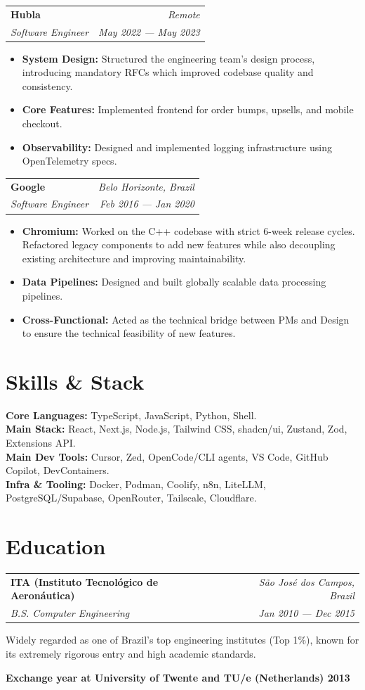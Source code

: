 \documentclass[11pt,letterpaper]{article}
\makeatletter
\newcommand{\resumeSubheading}[4]{%
  \vspace{0.12em}%
  \noindent
  \begin{tabular*}{\textwidth}{@{}p{0.68\textwidth}@{\extracolsep{\fill}}r@{}}
    {\bfseries #1} & {\textit{#2}} \\
    {\small\textit{#3}} & {\small\textit{#4}}
  \end{tabular*}%
  \par\vspace{0.06em}%
}
\makeatother
\begin{document}
\resumeSubheading{Hubla}{Remote}{Software Engineer}{May 2022 --- May 2023}

\begin{itemize}
  \item \textbf{System Design:} Structured the engineering team's design process, introducing mandatory RFCs which improved codebase quality and consistency.
  \item \textbf{Core Features:} Implemented frontend for order bumps, upsells, and mobile checkout.
  \item \textbf{Observability:} Designed and implemented logging infrastructure using OpenTelemetry specs.
\end{itemize}

\resumeSubheading{Google}{Belo Horizonte, Brazil}{Software Engineer}{Feb 2016 --- Jan 2020}

\begin{itemize}
  \item \textbf{Chromium:} Worked on the C++ codebase with strict 6-week release cycles. Refactored legacy components to add new features while also decoupling existing architecture and improving maintainability.
  \item \textbf{Data Pipelines:} Designed and built globally scalable data processing pipelines.
  \item \textbf{Cross-Functional:} Acted as the technical bridge between PMs and Design to ensure the technical feasibility of new features.
\end{itemize}

\section{Skills \& Stack}

{\small
\textbf{Core Languages:} TypeScript, JavaScript, Python, Shell.\\
\textbf{Main Stack:} React, Next.js, Node.js, Tailwind CSS, shadcn/ui, Zustand, Zod, Extensions API.\\
\textbf{Main Dev Tools:} Cursor, Zed, OpenCode/CLI agents, VS Code, GitHub Copilot, DevContainers.\\
\textbf{Infra \& Tooling:} Docker, Podman, Coolify, n8n, LiteLLM, PostgreSQL/Supabase, OpenRouter, Tailscale, Cloudflare.
}

\section{Education}

\resumeSubheading{ITA (Instituto Tecnológico de Aeronáutica)}{São José dos Campos, Brazil}{B.S. Computer Engineering}{Jan 2010 --- Dec 2015}

Widely regarded as one of Brazil's top engineering institutes (Top 1\%), known for its extremely rigorous entry and high academic standards.

\textbf{Exchange year at University of Twente and TU/e (Netherlands) \textbar{} 2013}
\end{document}
